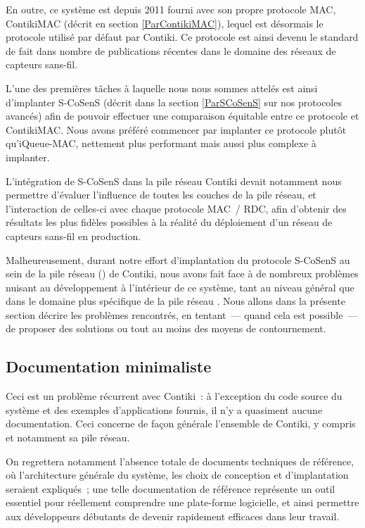 En outre, ce système est depuis 2011 fourni avec son propre protocole MAC,
ContikiMAC (décrit en section \vref{ParContikiMAC}), lequel est désormais
le protocole utilisé par défaut par Contiki. Ce protocole est ainsi devenu
le standard de fait dans nombre de publications récentes dans le domaine
des réseaux de capteurs sans-fil.

L'une des premières tâches à laquelle nous nous sommes attelés est ainsi
d'implanter S-CoSenS (décrit dans la section \vref{ParSCoSenS} sur nos
protocoles avancés) afin de pouvoir effectuer une comparaison équitable
entre ce protocole et ContikiMAC. Nous avons préféré commencer par
implanter ce protocole plutôt qu'iQueue-MAC, nettement plus
performant mais aussi plus complexe à implanter.

L'intégration de S-CoSenS dans la pile réseau Contiki devait notamment nous
permettre d'évaluer l'influence de toutes les couches de la pile réseau, et 
l'interaction de celles-ci avec chaque protocole MAC~/ RDC, afin d'obtenir
des résultats les plus fidèles possibles à la réalité du déploiement
d'un réseau de capteurs sans-fil en production.

\bigskip

Malheureusement, durant notre effort d'implantation du protocole S-CoSenS
au sein de la pile réseau () de Contiki, nous avons fait
face à de nombreux problèmes nuisant au développement à l'intérieur de ce
système, tant au niveau général que dans le domaine plus spécifique de
la pile réseau \cite{KR-RR-8776-2013}.
Nous allons dans la présente section décrire les problèmes
rencontrés, en tentant~--- quand cela est possible~--- de proposer des
solutions ou tout au moins des moyens de contournement.


\subsection{Documentation minimaliste}
\label{SubsecDocContiki}

Ceci est un problème récurrent avec Contiki~: à l'exception du code source
du système et des exemples d'applications fournis, il n'y a quasiment aucune
documentation. Ceci concerne de façon générale l'ensemble de Contiki,
y compris et notamment sa pile réseau.

On regrettera notamment l'absence totale de documents techniques de référence,
où l'architecture générale du système, les choix de conception et
d'implantation seraient expliqués~; une telle documentation de référence
représente un outil essentiel pour réellement comprendre une plate-forme
logicielle, et ainsi permettre aux développeurs débutants de devenir
rapidement efficaces dans leur travail.

